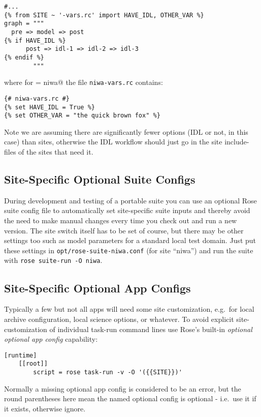 \lstset{language=suiterc}
\begin{lstlisting}
#...
{% from SITE ~ '-vars.rc' import HAVE_IDL, OTHER_VAR %}
graph = """
  pre => model => post
{% if HAVE_IDL %}
      post => idl-1 => idl-2 => idl-3
{% endif %}
        """
\end{lstlisting}

where for \lstinline@SITE = niwa@ the file \lstinline=niwa-vars.rc= contains:
\lstset{language=suiterc}
\begin{lstlisting}
{# niwa-vars.rc #}
{% set HAVE_IDL = True %}
{% set OTHER_VAR = "the quick brown fox" %}
\end{lstlisting}

Note we are assuming there are significantly fewer options (IDL or not, in this
case) than sites, otherwise the IDL workflow should just go in the site
include-files of the sites that need it.

\subsection{Site-Specific Optional Suite Configs}

During development and testing of a portable suite you can use an optional Rose
suite config file to automatically set site-specific suite inputs and thereby
avoid the need to make manual changes every time you check out and run a new
version. The site switch itself has to be set of course, but there may be other
settings too such as model parameters for a standard local test domain. Just
put these settings in \lstinline=opt/rose-suite-niwa.conf= (for site ``niwa'')
and run the suite with \lstinline=rose suite-run -O niwa=.

\subsection{Site-Specific Optional App Configs}

Typically a few but not all apps will need some site customization, e.g.\ for
local archive configuration, local science options, or whatever. To avoid
explicit site-customization of individual task-run command lines use Rose's
built-in {\em optional optional app config} capability:

\lstset{language=suiterc}
\begin{lstlisting}
[runtime]
    [[root]]
        script = rose task-run -v -O '({{SITE}})'
\end{lstlisting}

Normally a missing optional app config is considered to be an error, but the 
round parentheses here mean the named optional config is optional - i.e.\
use it if it exists, otherwise ignore.

